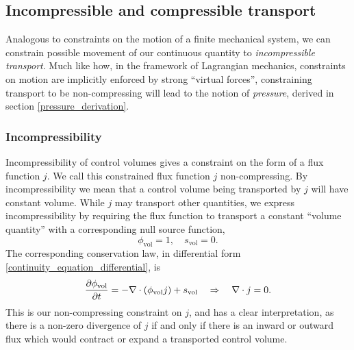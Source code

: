 \subsection{Incompressible and compressible transport}
Analogous to constraints on the motion of a finite mechanical system,
we can constrain possible movement of our continuous quantity to \textit{incompressible transport}. Much like how, in the framework of Lagrangian mechanics,
constraints on motion are implicitly enforced by strong ``virtual forces'', constraining transport to be non-compressing will lead to
the notion of \textit{pressure}, derived in section \ref{pressure_derivation}.

\subsubsection{Incompressibility}
Incompressibility of control volumes gives a constraint on the form of a flux function $j$.
We call this constrained flux function $j$ non-compressing.
By incompressibility we mean that a control volume being transported by $j$ will have
constant volume. While $j$ may transport other quantities, we express incompressibility by requiring the flux function to transport a constant ``volume quantity''
with a corresponding null source function,
    $$\phi_{\text{vol}} = 1,\quad s_{\text{vol}} = 0.$$
The corresponding conservation law, in differential form \eqref{continuity_equation_differential}, is
\begin{equation}\label{volume_conservation_law}
    \frac{\partial \phi_{\text{vol}}}{\partial t} = -\nabla \cdot (\phi_{\text{vol}}j) + s_{\text{vol}}
        \quad\Rightarrow\quad \nabla\cdot j = 0.
\end{equation}
This is our non-compressing constraint on $j$, and has a clear interpretation, as there is a non-zero divergence of $j$ if and only if
there is an inward or outward flux which would contract or expand a transported control volume.
